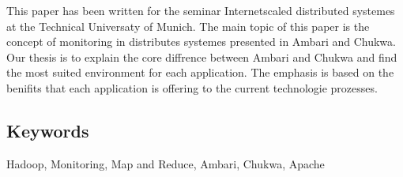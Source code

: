 This paper has been written for the seminar Internetscaled distributed systemes at the Technical Universaty of Munich. The main topic of this paper is the concept of monitoring in distributes systemes presented in Ambari and Chukwa. Our thesis is to explain the core diffrence between Ambari and Chukwa and find the most suited environment for each application. The emphasis is based on the benifits that each application is offering to the current technologie prozesses.

\subsection{Keywords}
Hadoop, Monitoring, Map and Reduce, Ambari, Chukwa, Apache 
